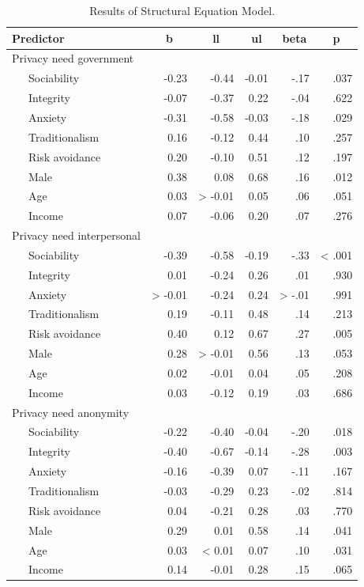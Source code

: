 \documentclass[man,floatsintext]{apa6}
\begin{document}
\begin{table}[tbp]
\begin{center}
\begin{threeparttable}
\caption{\label{tab:sem-tab}Results of Structural Equation Model.}
\footnotesize{
\begin{tabular}{lrrrrr}
\toprule
Predictor & \multicolumn{1}{c}{b} & \multicolumn{1}{c}{ll} & \multicolumn{1}{c}{ul} & \multicolumn{1}{c}{beta} & \multicolumn{1}{c}{p}\\
\midrule
Privacy need government &  &  &  &  & \\
\ \ \ Sociability & -0.23 & -0.44 & -0.01 & -.17 & .037\\
\ \ \ Integrity & -0.07 & -0.37 & 0.22 & -.04 & .622\\
\ \ \ Anxiety & -0.31 & -0.58 & -0.03 & -.18 & .029\\
\ \ \ Traditionalism & 0.16 & -0.12 & 0.44 & .10 & .257\\
\ \ \ Risk avoidance & 0.20 & -0.10 & 0.51 & .12 & .197\\
\ \ \ Male & 0.38 & 0.08 & 0.68 & .16 & .012\\
\ \ \ Age & 0.03 & > -0.01 & 0.05 & .06 & .051\\
\ \ \ Income & 0.07 & -0.06 & 0.20 & .07 & .276\\
Privacy need interpersonal &  &  &  &  & \\
\ \ \ Sociability & -0.39 & -0.58 & -0.19 & -.33 & < .001\\
\ \ \ Integrity & 0.01 & -0.24 & 0.26 & .01 & .930\\
\ \ \ Anxiety & > -0.01 & -0.24 & 0.24 & > -.01 & .991\\
\ \ \ Traditionalism & 0.19 & -0.11 & 0.48 & .14 & .213\\
\ \ \ Risk avoidance & 0.40 & 0.12 & 0.67 & .27 & .005\\
\ \ \ Male & 0.28 & > -0.01 & 0.56 & .13 & .053\\
\ \ \ Age & 0.02 & -0.01 & 0.04 & .05 & .208\\
\ \ \ Income & 0.03 & -0.12 & 0.19 & .03 & .686\\
Privacy need anonymity &  &  &  &  & \\
\ \ \ Sociability & -0.22 & -0.40 & -0.04 & -.20 & .018\\
\ \ \ Integrity & -0.40 & -0.67 & -0.14 & -.28 & .003\\
\ \ \ Anxiety & -0.16 & -0.39 & 0.07 & -.11 & .167\\
\ \ \ Traditionalism & -0.03 & -0.29 & 0.23 & -.02 & .814\\
\ \ \ Risk avoidance & 0.04 & -0.21 & 0.28 & .03 & .770\\
\ \ \ Male & 0.29 & 0.01 & 0.58 & .14 & .041\\
\ \ \ Age & 0.03 & < 0.01 & 0.07 & .10 & .031\\
\ \ \ Income & 0.14 & -0.01 & 0.28 & .15 & .065\\
\bottomrule
\end{tabular}
}
\end{threeparttable}
\end{center}
\end{table}
\end{document}
